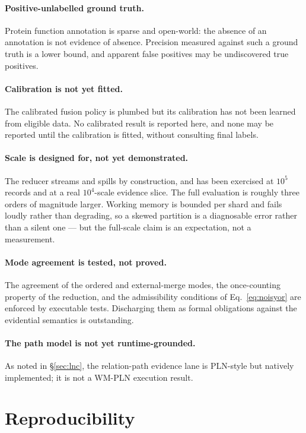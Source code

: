 \documentclass[11pt]{article}
\begin{document}
\paragraph{Positive-unlabelled ground truth.} Protein function annotation is
sparse and open-world: the absence of an annotation is not evidence of absence.
Precision measured against such a ground truth is a lower bound, and apparent
false positives may be undiscovered true positives.

\paragraph{Calibration is not yet fitted.} The calibrated fusion policy is
plumbed but its calibration has not been learned from eligible data. No
calibrated result is reported here, and none may be reported until the
calibration is fitted, without consulting final labels.

\paragraph{Scale is designed for, not yet demonstrated.} The reducer streams and
spills by construction, and has been exercised at $10^5$ records and at a real
$10^4$-scale evidence slice. The full evaluation is roughly three orders of
magnitude larger. Working memory is bounded per shard and fails loudly rather
than degrading, so a skewed partition is a diagnosable error rather than a
silent one --- but the full-scale claim is an expectation, not a measurement.

\paragraph{Mode agreement is tested, not proved.} The agreement of the ordered
and external-merge modes, the once-counting property of the reduction, and the
admissibility conditions of Eq.~\ref{eq:noisyor} are enforced by executable
tests. Discharging them as formal obligations against the evidential semantics
is outstanding.

\paragraph{The path model is not yet runtime-grounded.} As noted in
\S\ref{sec:lnc}, the relation-path evidence lane is PLN-style but natively
implemented; it is not a WM-PLN execution result.

\section{Reproducibility}
\end{document}
